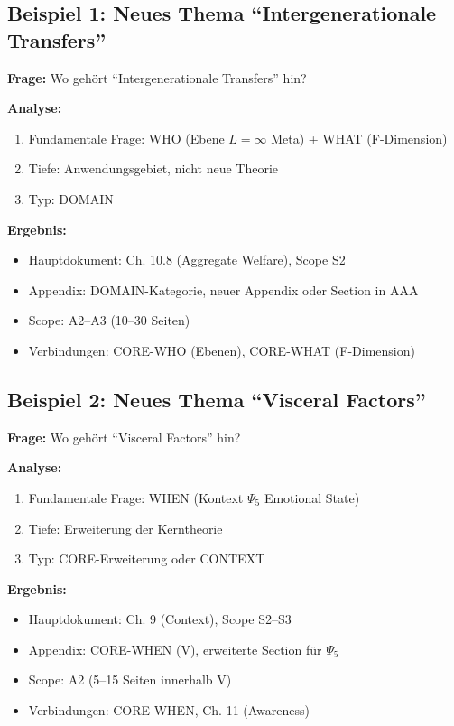 \documentclass[12pt,a4paper]{article}
\begin{document}
\subsection{Beispiel 1: Neues Thema ``Intergenerationale Transfers''}

\begin{tcolorbox}[colback=blue!5!white, colframe=blue!50!black]
\textbf{Frage:} Wo gehört ``Intergenerationale Transfers'' hin?

\textbf{Analyse:}
\begin{enumerate}[nosep]
\item Fundamentale Frage: WHO (Ebene $L=\infty$ Meta) + WHAT (F-Dimension)
\item Tiefe: Anwendungsgebiet, nicht neue Theorie
\item Typ: DOMAIN
\end{enumerate}

\textbf{Ergebnis:}
\begin{itemize}[nosep]
\item Hauptdokument: Ch. 10.8 (Aggregate Welfare), Scope S2
\item Appendix: DOMAIN-Kategorie, neuer Appendix oder Section in AAA
\item Scope: A2--A3 (10--30 Seiten)
\item Verbindungen: CORE-WHO (Ebenen), CORE-WHAT (F-Dimension)
\end{itemize}
\end{tcolorbox}

\subsection{Beispiel 2: Neues Thema ``Visceral Factors''}

\begin{tcolorbox}[colback=blue!5!white, colframe=blue!50!black]
\textbf{Frage:} Wo gehört ``Visceral Factors'' hin?

\textbf{Analyse:}
\begin{enumerate}[nosep]
\item Fundamentale Frage: WHEN (Kontext $\Psi_5$ Emotional State)
\item Tiefe: Erweiterung der Kerntheorie
\item Typ: CORE-Erweiterung oder CONTEXT
\end{enumerate}

\textbf{Ergebnis:}
\begin{itemize}[nosep]
\item Hauptdokument: Ch. 9 (Context), Scope S2--S3
\item Appendix: CORE-WHEN (V), erweiterte Section für $\Psi_5$
\item Scope: A2 (5--15 Seiten innerhalb V)
\item Verbindungen: CORE-WHEN, Ch. 11 (Awareness)
\end{itemize}
\end{tcolorbox}
\end{document}
